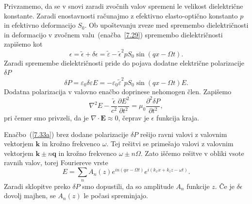 Privzamemo, da se v snovi zaradi zvočnih valov spremeni le velikost
dielektrične konstante. Zaradi enostavnosti računajmo z efektivno elasto-optično
konstanto $p$ in efektivno deformacijo $S_0$. Ob upoštevanju zveze med
spremembo dielektričnosti in deformacijo
v zvočnem valu~(enačba~\ref{7.29}) spremembo dielektričnosti
zapišemo kot  
\begin{equation}
\epsilon=\tilde{\epsilon}+\delta\epsilon = 
\tilde{\varepsilon} -\tilde{\epsilon}^{2}pS_{0}\sin(qx-\Omega t).
\label{7.33}
\end{equation}
Zaradi spremembe dielektričnosti pride do pojava
dodatne električne polarizacije $\delta P$
\begin{equation}
\delta P = \varepsilon_0 \delta \varepsilon E = - \varepsilon_0 
\tilde{\varepsilon}^2 p S_0 \sin(qx-\Omega t)E.
\end{equation}
Dodatna polarizacija v valovno enačbo doprinese nehomogen člen. Zapišemo
\begin{equation}
\nabla^{2}E-\frac{\tilde{\epsilon}}{c^{2}}{\frac{\partial E^{2}}
{\partial t^{2}}}=\mu_{0}{\frac{\partial^2 \delta P}{\partial t^{2}}},
\label{7.33a}
\end{equation}
pri čemer smo privzeli, da je $\nabla\cdot\mathbf{E}\approx 0$, čeprav je
$\epsilon$ funkcija kraja. 

Enačbo~(\ref{7.33a}) brez dodane polarizacije $\delta P$ rešijo ravni valovi 
z valovnim vektorjem $\mathbf{k}$ in krožno frekvenco $\omega$. Tej rešitvi se 
primešajo valovi z valovnim vektorjem $\mathbf{k}\pm n\mathbf{q}$
in krožno frekvenco $\omega\pm n\Omega$. Zato iščemo rešitve v obliki vsote
ravnih valov, torej Fouriereve vrste
\begin{equation}
E=\sum_{n}A_{n}(z)e^{in(qx-\Omega t)}e^{i(k_{x}x+k_{z}z-\omega t)}.
\label{7.34}
\end{equation}
Zaradi sklopitve preko $\delta P$ smo dopustili, da so amplitude
$A_{n}$ funkcije $z$. Če je $\delta\epsilon$ dovolj majhen, se $A_{n}(z)$
le počasi spreminjajo.

